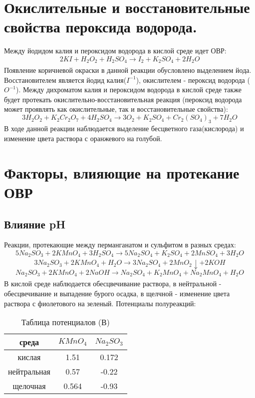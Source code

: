\documentclass[a4paper, 12pt]{article}
\begin{document}
 \section{Окислительные и восстановительные свойства пероксида водорода.}
Между йодидом калия и пероксидом водорода в кислой среде идет ОВР:
\begin{equation}
    2KI + H_2O_2 + H_2SO_4 \xrightarrow[]{} I_2 + K_2SO_4 + 2H_2O
\end{equation}
Появление коричневой окраски в данной реакции обусловлено выделением йода. Восстановителем является йодид калия($I^{-1}$), окислителем - пероксид водорода ($O^{-1}$). \newline
Между дихроматом калия и пероксидом водорода в кислой среде также будет протекать окислительно-восстановительная реакция (пероксид водорода может проявлять как окислительные, так и восстановительные свойства):
\begin{equation}
    3H_2O_2 + K_2Cr_2O_7 + 4H_2SO_4 \xrightarrow[]{} 3O_2 + K_2SO_4 + Cr_2(SO_4)_3 + 7H_2O
\end{equation}
В ходе данной реакции наблюдается выделение бесцветного газа(кислорода) и изменение цвета раствора с оранжевого на голубой.
\section{Факторы, влияющие на протекание ОВР}
\subsection{Влияние pH}
Реакции, протекающие между перманганатом и сульфитом в разных средах:
\begin{equation}
     5Na_2SO_3 + 2KMnO_4 + 3H_2SO_4 \xrightarrow[]{} 5Na_2SO_4 + K_2SO_4 + 2MnSO_4 + 3H_2O 
    \end{equation}
    \begin{equation}
    3Na_2SO_3 + 2KMnO_4 + H_2O \xrightarrow[]{} 3Na_2SO_4 + 2MnO_2 \downarrow + 2KOH
    \end{equation}
    \begin{equation}
    Na_2SO_3 + 2KMnO_4 + 2NaOH \xrightarrow[]{} Na_2SO_4 + K_2MnO_4 + Na_2MnO_4 + H_2O
    \end{equation}
В кислой среде наблюдается обесцвечивание раствора, в нейтральной - обесцвечивание и выпадение бурого осадка, в щелчной - изменение цвета раствора с фиолетового на зеленый.
Потенциалы полуреакций:
\begin{table}[H]
    \centering
    \begin{tabular}{|c|c|c|}\hline
       среда & $KMnO_4$ & $Na_2SO_3$ \\  \hline
        кислая &1.51 &	0.172 \\ \hline
        нейтральная & 0.57 & -0.22 \\ \hline
        щелочная &0.564 & -0.93 \\ \hline
    \end{tabular}
    \caption{Таблица потенциалов (В)}
    \label{tab:my_label}
\end{table}
\end{document}
